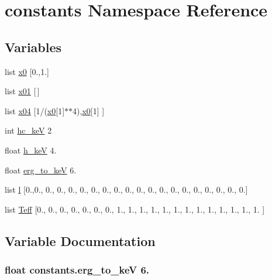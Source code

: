 \hypertarget{namespaceconstants}{\section{constants Namespace Reference}
\label{namespaceconstants}
}
\subsection*{Variables}
\begin{DoxyCompactItemize}
\item 
list \hyperlink{namespaceconstants_a8bd1a0146a51ce5d2a094e0390ad9d6e}{x0} \mbox{[}0.,1.\mbox{]}
\item 
list \hyperlink{namespaceconstants_aba7f89394c33cc1f4a503e8e7717fd15}{x01} \mbox{[}$\,$\mbox{]}
\item 
list \hyperlink{namespaceconstants_a8e11ebfc367fa217f4a4a97b1cace351}{x04} \mbox{[}1/(\hyperlink{namespaceconstants_a8bd1a0146a51ce5d2a094e0390ad9d6e}{x0}\mbox{[}1\mbox{]}$\ast$$\ast$4),\hyperlink{namespaceconstants_a8bd1a0146a51ce5d2a094e0390ad9d6e}{x0}\mbox{[}1\mbox{]} \mbox{]}
\item 
int \hyperlink{namespaceconstants_a8fc14c04ea3ffbe7eae735ef06d48159}{hc\-\_\-ke\-V} 2
\item 
float \hyperlink{namespaceconstants_a0efe5dbf3416b5b896e1105131013d28}{h\-\_\-ke\-V} 4.
\item 
float \hyperlink{namespaceconstants_add459d29b0a5f062900b4804c6883fda}{erg\-\_\-to\-\_\-ke\-V} 6.
\item 
list \hyperlink{namespaceconstants_aee868a178cf4ca6c018337428f1ab0aa}{l} \mbox{[}0.,0., 0., 0., 0., 0., 0., 0., 0., 0., 0., 0., 0., 0., 0., 0., 0., 0., 0., 0.\mbox{]}
\item 
list \hyperlink{namespaceconstants_ab0dc80c3bd717af623b46afcb757d81f}{Teff} \mbox{[}0., 0., 0., 0., 0., 0., 0., 1., 1., 1., 1., 1., 1., 1., 1., 1., 1., 1., 1., 1. \mbox{]}
\end{DoxyCompactItemize}


\subsection{Variable Documentation}
\hypertarget{namespaceconstants_add459d29b0a5f062900b4804c6883fda}{
\subsubsection[{erg\-\_\-to\-\_\-ke\-V}]{\setlength{\rightskip}{0pt plus 5cm}float constants.\-erg\-\_\-to\-\_\-ke\-V 6.}}\label{namespaceconstants_add459d29b0a5f062900b4804c6883fda}



